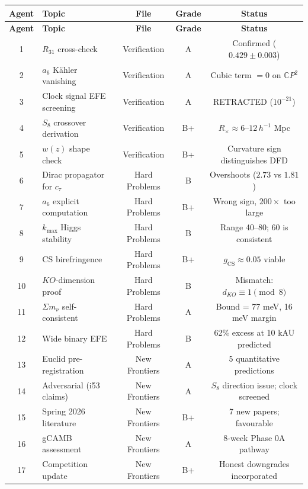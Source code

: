 \documentclass[11pt,a4paper]{article}
\newcommand{\CP}{\mathbb{C}P}
\begin{document}
\begin{center}
\begin{longtable}{clccc}
\toprule
\textbf{Agent} & \textbf{Topic} & \textbf{File} & \textbf{Grade} & \textbf{Status} \\
\midrule
\endfirsthead
\toprule
\textbf{Agent} & \textbf{Topic} & \textbf{File} & \textbf{Grade} & \textbf{Status} \\
\midrule
\endhead
1 & $R_{31}$ cross-check & Verification & A & Confirmed ($0.429 \pm 0.003$) \\
2 & $a_6$ K\"ahler vanishing & Verification & A & Cubic term $= 0$ on $\CP^2$ \\
3 & Clock signal EFE screening & Verification & A & RETRACTED ($10^{-21}$) \\
4 & $S_8$ crossover derivation & Verification & B+ & $R_\times \approx 6$--$12\,h^{-1}$ Mpc \\
5 & $w(z)$ shape check & Verification & B+ & Curvature sign distinguishes DFD \\
\midrule
6 & Dirac propagator for $c_\tau$ & Hard Problems & B & Overshoots ($2.73$ vs $1.81$) \\
7 & $a_6$ explicit computation & Hard Problems & B+ & Wrong sign, $200\times$ too large \\
8 & $k_{\max}$ Higgs stability & Hard Problems & B & Range 40--80; 60 is consistent \\
9 & CS birefringence & Hard Problems & B+ & $g_{\mathrm{CS}} \approx 0.05$ viable \\
10 & $KO$-dimension proof & Hard Problems & B & Mismatch: $d_{KO} \equiv 1 \pmod{8}$ \\
11 & $\Sigma m_\nu$ self-consistent & Hard Problems & A & Bound = 77 meV, 16 meV margin \\
12 & Wide binary EFE & Hard Problems & B & 62\% excess at 10 kAU predicted \\
\midrule
13 & Euclid pre-registration & New Frontiers & A & 5 quantitative predictions \\
14 & Adversarial (i53 claims) & New Frontiers & A & $S_8$ direction issue; clock screened \\
15 & Spring 2026 literature & New Frontiers & B+ & 7 new papers; favourable \\
16 & gCAMB assessment & New Frontiers & A & 8-week Phase 0A pathway \\
17 & Competition update & New Frontiers & B+ & Honest downgrades incorporated \\
\bottomrule
\end{longtable}
\end{center}
\end{document}
